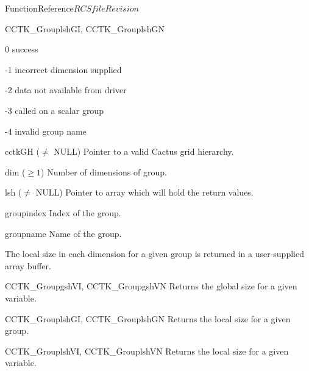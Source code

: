 \begin{cactuspart}{FunctionReference}{$RCSfile$}{$Revision$}
\begin{FunctionDescription}{CCTK\_GrouplshGI, CCTK\_GrouplshGN}
\begin{ResultSection}
\begin{Result}{\rm 0} success \end{Result}
\begin{Result}{\rm -1} incorrect dimension supplied \end{Result}
\begin{Result}{\rm -2} data not available from driver \end{Result}
\begin{Result}{\rm -3} called on a scalar group \end{Result}
\begin{Result}{\rm -4} invalid group name \end{Result}
\end{ResultSection}

\begin{ParameterSection}
\begin{Parameter}{cctkGH ($\ne$ NULL)} Pointer to a valid Cactus grid hierarchy. \end{Parameter}
\begin{Parameter}{dim ($\ge 1$)} Number of dimensions of group. \end{Parameter}
\begin{Parameter}{lsh ($\ne$ NULL)} Pointer to array which will hold the return values. \end{Parameter}
\begin{Parameter}{groupindex} Index of the group. \end{Parameter}
\begin{Parameter}{groupname} Name of the group. \end{Parameter}
\end{ParameterSection}

\begin{Discussion}
The local size in each dimension for a given group is returned in a user-supplied array buffer.
\end{Discussion}

\begin{SeeAlsoSection}
\begin{SeeAlso}{CCTK\_GroupgshVI, CCTK\_GroupgshVN}
Returns the global size for a given variable.
\end{SeeAlso}
\begin{SeeAlso}{CCTK\_GrouplshGI, CCTK\_GrouplshGN}
Returns the local size for a given group.
\end{SeeAlso}
\begin{SeeAlso}{CCTK\_GrouplshVI, CCTK\_GrouplshVN}
Returns the local size for a given variable.
\end{SeeAlso}
\end{SeeAlsoSection}


\end{FunctionDescription}
\end{cactuspart}
